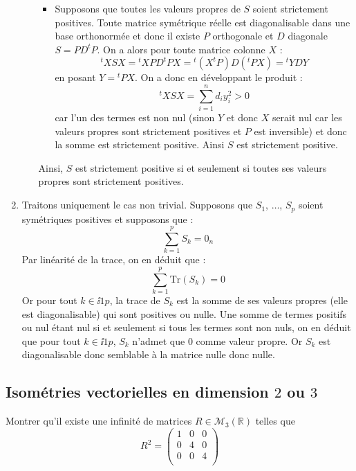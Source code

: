 \documentclass[a4paper,twoside,french,11pt]{VcCours}
\begin{document}
\begin{enumerate}
\begin{enumerate}
\begin{itemize}
\item Supposons que toutes les valeurs propres de $S$ soient strictement positives. Toute matrice symétrique réelle est diagonalisable dans une base orthonormée et donc il existe $P$ orthogonale et $D$ diagonale $S=PD^{t}P$. On a alors pour toute matrice colonne $X$ :
$$^{t}XSX={}^{t}XPD^{t}PX={}^{t}\left( X^{t}P\right) D(^{t}PX)={}^{t}YDY$$
en posant $Y={}^{t}PX$. On a donc en développant le produit :
$$^{t}XSX= \sum_{i=1}^{n}d_{i}y_{i}^{2} > 0$$
car l'un des termes est non nul (sinon $Y$ et donc $X$ serait nul car les valeurs propres sont strictement positives et $P$ est inversible) et donc la somme est strictement positive. Ainsi $S$ est strictement positive.
\end{itemize}
Ainsi, $S$ est strictement positive si et seulement si toutes ses valeurs propres sont strictement positives.
\end{enumerate}
\item Traitons uniquement le cas non trivial. Supposons que $S_1$, $\ldots$, $S_p$ soient symétriques positives et supposons que :
$$\sum_{k=1}^p S_k = 0_n$$
Par linéarité de la trace, on en déduit que :
$$ \sum_{k=1}^p \textrm{Tr}(S_k) = 0$$
Or pour tout $k \in \ii{1}{p}$, la trace de $S_k$ est la somme de ses valeurs propres (elle est diagonalisable) qui sont positives ou nulle. Une somme de termes positifs ou nul étant nul si et seulement si tous les termes sont non nuls, on en déduit que pour tout $k \in \ii{1}{p}$, $S_k$ n'admet que $0$ comme valeur propre. Or $S_k$ est diagonalisable donc semblable à la matrice nulle donc nulle.
\end{enumerate}


\subsection{Isométries vectorielles en dimension \texorpdfstring{$2$ ou $3$}{2 ou 3}}


\begin{Exercice}{} Montrer qu'il existe une infinité de matrices $R \in \mathcal{M}_3(\mathbb{R})$ telles que
$$  R^2 = \begin{pmatrix}
1 & 0 & 0 \\
0 & 4 & 0 \\
0 & 0 & 4 \\
\end{pmatrix}$$
\end{Exercice}
\end{document}

